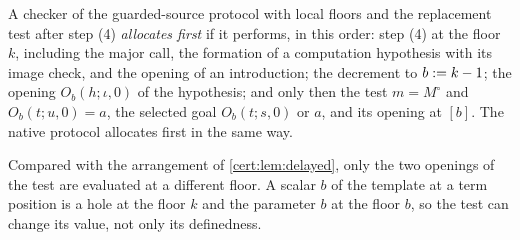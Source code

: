 \begin{definition}\label{cert:def:context-first}
A checker of the guarded-source protocol with local floors and the
replacement test after step (4) \emph{allocates first} if it performs, in this
order: step (4) at the floor $k$, including the major call, the formation of a
computation hypothesis with its image check, and the opening of an
introduction; the decrement to $b\mathrel{:=} k-1$; the opening $O_b(h;\iota,0)$ of
the hypothesis; and only then the test $m=M^{\circ}$ and $O_b(t;u,0)=a$, the
selected goal $O_b(t;s,0)$ or $a$, and its opening at $[b]$. The native
protocol allocates first in the same way.
\end{definition}

Compared with the arrangement of \cref{cert:lem:delayed}, only the two
openings of the test are evaluated at a different floor. A scalar $b$ of the
template at a term position is a hole at the floor $k$ and the parameter $b$
at the floor $b$, so the test can change its value, not only its definedness.


